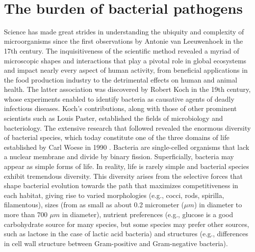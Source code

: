 \renewcommand*{\thefootnote}{\arabic{footnote}}

\mbox{}\\
\vspace{8cm}

\section{The burden of bacterial pathogens}

Science has made great strides in understanding the ubiquity and complexity of microorganisms since the first observations by Antonie van Leeuwenhoek in the 17th century. The inquisitiveness of the scientific method revealed a myriad of microscopic shapes and interactions that play a pivotal role in global ecosystems and impact nearly every aspect of human activity, from beneficial applications in the food production industry to the detrimental effects on human and animal health. The latter association was discovered by Robert Koch in the 19th century, whose experiments enabled to identify bacteria as causative agents of deadly infectious diseases. Koch’s contributions, along with those of other prominent scientists such as Louis Paster, established the fields of microbiology and bacteriology. The extensive research that followed revealed the enormous diversity of bacterial species, which today constitute one of the three domains of life established by Carl Woese in 1990 \cite{woese_towards_1990, woese_bacterial_1987}.
Bacteria are single-celled organisms that lack a nuclear membrane and divide by binary fission. Superficially, bacteria may appear as simple forms of life. In reality, life is rarely simple and bacterial species exhibit tremendous diversity. This diversity arises from the selective forces that shape bacterial evolution towards the path that maximizes competitiveness in each habitat, giving rise to varied morphologies (e.g., cocci, rods, spirilla, filamentous), sizes (from as small as about 0.2 micrometer ($\mu m$) in diameter to more than 700 $\mu m$ in diameter), nutrient preferences (e.g., glucose is a good carbohydrate source for many species, but some species may prefer other sources, such as lactose in the case of lactic acid bacteria) and structures (e.g., differences in cell wall structure between Gram-positive and Gram-negative bacteria).
